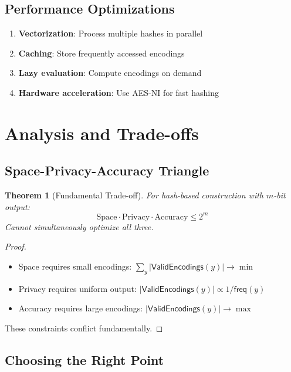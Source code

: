 \documentclass[11pt,final,hidelinks]{article}
\newtheorem{theorem}{Theorem}[section]
\newcommand{\ValidEnc}[1]{\mathsf{ValidEncodings}(#1)}
\newcommand{\Card}[1]{|#1|}
\newcommand{\Freq}[1]{\mathsf{freq}(#1)}
\begin{document}
\subsection{Performance Optimizations}

\begin{enumerate}
    \item \textbf{Vectorization}: Process multiple hashes in parallel
    \item \textbf{Caching}: Store frequently accessed encodings
    \item \textbf{Lazy evaluation}: Compute encodings on demand
    \item \textbf{Hardware acceleration}: Use AES-NI for fast hashing
\end{enumerate}

\section{Analysis and Trade-offs}

\subsection{Space-Privacy-Accuracy Triangle}

\begin{theorem}[Fundamental Trade-off]
For hash-based construction with $m$-bit output:
\begin{equation}
\text{Space} \cdot \text{Privacy} \cdot \text{Accuracy} \leq 2^m
\end{equation}
Cannot simultaneously optimize all three.
\end{theorem}

\begin{proof}
\begin{itemize}
    \item Space requires small encodings: $\sum_y \Card{\ValidEnc{y}} \to \min$
    \item Privacy requires uniform output: $\Card{\ValidEnc{y}} \propto 1/\Freq{y}$
    \item Accuracy requires large encodings: $\Card{\ValidEnc{y}} \to \max$
\end{itemize}
These constraints conflict fundamentally.
\end{proof}

\subsection{Choosing the Right Point}
\end{document}
